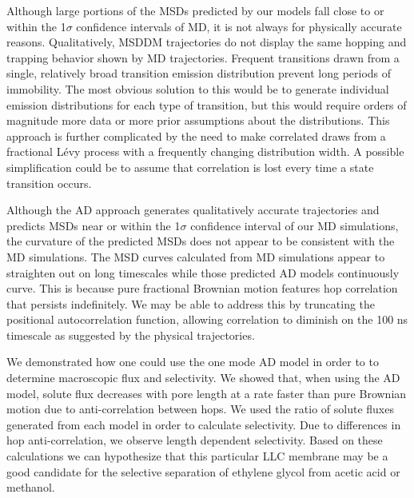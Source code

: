 \documentclass[aps,pre,preprint,groupedaddress,longbibliography]{revtex4-2}
\begin{document}
  Although large portions of the MSDs predicted by our models fall close to or 
  within the 1$\sigma$ confidence intervals of MD, it is not always for physically
  accurate reasons. Qualitatively, MSDDM trajectories do not display the same hopping
  and trapping behavior shown by MD trajectories. Frequent transitions drawn from a
  single, relatively broad transition emission distribution prevent long periods of
  immobility. The most obvious solution to this would be to generate individual emission
  distributions for each type of transition, but this would require orders of magnitude
  more data or more prior assumptions about the distributions.
  This approach is further complicated by the need to make correlated draws
  from a fractional L\'evy process with a frequently changing distribution width. 
  A possible simplification could be to assume that correlation is lost every time a
  state transition occurs.

  Although the AD approach generates qualitatively accurate trajectories and 
  predicts MSDs near or within the 1$\sigma$ confidence interval of our
  MD simulations, the curvature of the predicted MSDs does not appear to be consistent
  with the MD simulations. The MSD curves calculated from MD simulations 
  appear to straighten out on long timescales while those predicted
  AD models continuously curve. This is because pure fractional Brownian motion
  features hop correlation that persists indefinitely. We may be able to address
  this by truncating the positional autocorrelation function, allowing 
  correlation to diminish on the 100 ns timescale as suggested by the physical 
  trajectories.

  We demonstrated how one could use the one mode AD model in order to to determine
  macroscopic flux and selectivity. We showed that, when using the AD model, 
  solute flux decreases with pore length at a rate faster than pure 
  Brownian motion due to anti-correlation between hops. We used the ratio of 
  solute fluxes generated from each model in order to calculate selectivity. 
  Due to differences in hop anti-correlation, we observe length dependent 
  selectivity. Based on these calculations we can hypothesize that this 
  particular LLC membrane may be a good candidate for the selective separation
  of ethylene glycol from acetic acid or methanol.
  
\end{document}
